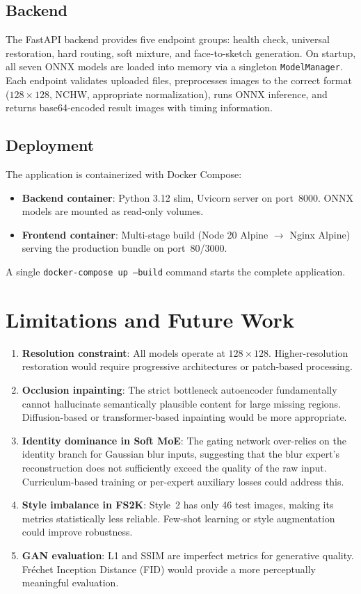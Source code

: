\documentclass[conference]{IEEEtran}
\begin{document}
\subsection{Backend}
The FastAPI backend provides five endpoint groups: health check, universal restoration, hard routing, soft mixture, and face-to-sketch generation. On startup, all seven ONNX models are loaded into memory via a singleton \texttt{ModelManager}. Each endpoint validates uploaded files, preprocesses images to the correct format ($128 \times 128$, NCHW, appropriate normalization), runs ONNX inference, and returns base64-encoded result images with timing information.

\subsection{Deployment}
The application is containerized with Docker Compose:
\begin{itemize}
    \item \textbf{Backend container}: Python 3.12 slim, Uvicorn server on port~8000. ONNX models are mounted as read-only volumes.
    \item \textbf{Frontend container}: Multi-stage build (Node 20 Alpine $\rightarrow$ Nginx Alpine) serving the production bundle on port~80/3000.
\end{itemize}

A single \texttt{docker-compose up --build} command starts the complete application.

\section{Limitations and Future Work}
\label{sec:limitations}

\begin{enumerate}
    \item \textbf{Resolution constraint}: All models operate at $128 \times 128$. Higher-resolution restoration would require progressive architectures or patch-based processing.
    \item \textbf{Occlusion inpainting}: The strict bottleneck autoencoder fundamentally cannot hallucinate semantically plausible content for large missing regions. Diffusion-based or transformer-based inpainting would be more appropriate.
    \item \textbf{Identity dominance in Soft MoE}: The gating network over-relies on the identity branch for Gaussian blur inputs, suggesting that the blur expert's reconstruction does not sufficiently exceed the quality of the raw input. Curriculum-based training or per-expert auxiliary losses could address this.
    \item \textbf{Style imbalance in FS2K}: Style~2 has only 46 test images, making its metrics statistically less reliable. Few-shot learning or style augmentation could improve robustness.
    \item \textbf{GAN evaluation}: L1 and SSIM are imperfect metrics for generative quality. Fréchet Inception Distance (FID) would provide a more perceptually meaningful evaluation.
\end{enumerate}
\end{document}
